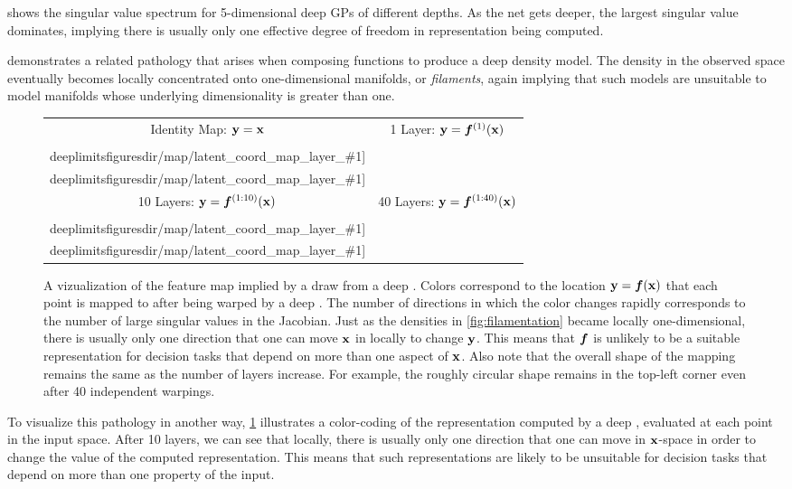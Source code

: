 %
 shows the singular value spectrum for 5-dimensional deep GPs of different depths.
As the net gets deeper, the largest singular value dominates, implying there is usually only one effective degree of freedom in representation being computed.

 demonstrates a related pathology that arises when composing functions to produce a deep density model.
The density in the observed space eventually becomes locally concentrated onto one-dimensional manifolds, or \emph{filaments}, again implying that such models are unsuitable to model manifolds whose underlying dimensionality is greater than one.

\newcommand{\mappic}[1]{ \texttt{[image: \\deeplimitsfiguresdir/map/latent\_coord\_map\_layer\_\#1]} } 
\newcommand{\mappiccon}[1]{ \texttt{[image: \\deeplimitsfiguresdir/map\_connected/latent\_coord\_map\_layer\_\#1]} }
\begin{figure}
\centering
\begin{tabular}{cc}
\hspace{-0.15in} Identity Map: ${\bf{y}} = {\bf{x}}$ &
\hspace{-0.15in} 1 Layer: ${\bf{y}} = \boldsymbol{f}^{(1)}({\bf{x}})$ \\
\hspace{-0.15in} \mappic{0} & \mappic{1} \\
\hspace{-0.15in} 10 Layers: ${\bf{y}} = \boldsymbol{f}^{(1:10)}({\bf{x}})$ &
\hspace{-0.15in} 40 Layers: ${\bf{y}} = \boldsymbol{f}^{(1:40)}({\bf{x}})$ \\
\hspace{-0.15in} \mappic{10} & \mappic{40}
\end{tabular}
\caption[Visualization of a feature map drawn from a deep \sgp{}]
{A vizualization of the feature map implied by a draw from a deep \gp{}.
Colors correspond to the location ${\bf{y}} = \boldsymbol{f}({\bf{x}})$ that each point is mapped to after being warped by a deep \gp{}.
The number of directions in which the color changes rapidly corresponds to the number of large singular values in the Jacobian.
Just as the densities in \cref{fig:filamentation} became locally one-dimensional, there is usually only one direction that one can move ${\bf{x}}$ in locally to change ${\bf{y}}$.
This means that $\boldsymbol{f}$ is unlikely to be a suitable representation for decision tasks that depend on more than one aspect of ${\bf{x}}$.  Also note that the overall shape of the mapping remains the same as the number of layers increase.
For example, the roughly circular shape remains in the top-left corner even after 40 independent warpings.}
\label{fig:deep_map}
\end{figure}
%
To visualize this pathology in another way, \cref{fig:deep_map} illustrates a color-coding of the representation computed by a deep \gp{}, evaluated at each point in the input space.
After 10 layers, we can see that locally, there is usually only one direction that one can move in ${\bf{x}}$-space in order to change the value of the computed representation.
This means that such representations are likely to be unsuitable for decision tasks that depend on more than one property of the input.


